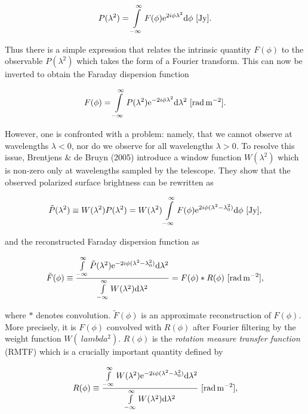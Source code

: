\documentclass[a4paper,10pt]{article}
\begin{document}
\begin{align*}
    P(\lambda^2) = \int\limits_{-\infty}^\infty F(\phi)\mathrm{e}^{2i\phi\lambda^2}\mathrm{d}\phi ~ [{\rm Jy}].
\end{align*}

{\noindent}Thus there is a simple expression that relates the intrinsic quantity $F(\phi)$ to the observable $P(\lambda^2)$ which takes the form of a Fourier transform. This can now be inverted to obtain the Faraday dispersion function

\begin{align*}
    F(\phi) = \int\limits_{-\infty}^\infty P(\lambda^2)\mathrm{e}^{-2i\phi\lambda^2}\mathrm{d}\lambda^2 ~ [{\rm rad\,m^{-2}}].
\end{align*}

{\noindent}However, one is confronted with a problem: namely, that we cannot observe at wavelengths $\lambda<0$, nor do we observe for all wavelengths $\lambda>0$. To resolve this issue, Brentjens \& de Bruyn (2005) introduce a window function $W(\lambda^2)$ which is non-zero only at wavelengths sampled by the telescope. They show that the observed polarized surface brightness can be rewritten as 

\begin{align*}
    \tilde{P}(\lambda^2) \equiv W(\lambda^2)P(\lambda^2) = W(\lambda^2) \int\limits_{-\infty}^\infty F(\phi)\mathrm{e}^{2i\phi(\lambda^2-\lambda_0^2)}\mathrm{d}\phi ~ [{\rm Jy}],
\end{align*}

{\noindent}and the reconstructed Faraday dispersion function as

\begin{align*}
    \tilde{F}(\phi) \equiv \dfrac{\int\limits_{-\infty}^\infty \tilde{P}(\lambda^2)\mathrm{e}^{-2i\phi(\lambda^2-\lambda_0^2)}\mathrm{d}\lambda^2}{\int\limits_{-\infty}^\infty W(\lambda^2)\mathrm{d}\lambda^2} = F(\phi) * R(\phi) ~ [{\rm rad\,m^{-2}}],
\end{align*}

{\noindent}where $*$ denotes convolution. $\tilde{F}(\phi)$ is an approximate reconstruction of $F(\phi)$. More precisely, it is $F(\phi)$ convolved with $R(\phi)$ after Fourier filtering by the weight function $W(\
lambda^2)$. $R(\phi)$ is the \textit{rotation measure transfer function} (RMTF) which is a crucially important quantity defined by

\begin{align*}
    R(\phi) \equiv \dfrac{\int\limits_{-\infty}^\infty W(\lambda^2)\mathrm{e}^{-2i\phi(\lambda^2-\lambda_0^2)}\mathrm{d}\lambda^2}{\int\limits_{-\infty}^\infty W(\lambda^2)\mathrm{d}\lambda^2} ~ [{\rm rad\,m^{-2}}],
\end{align*}
\end{document}
